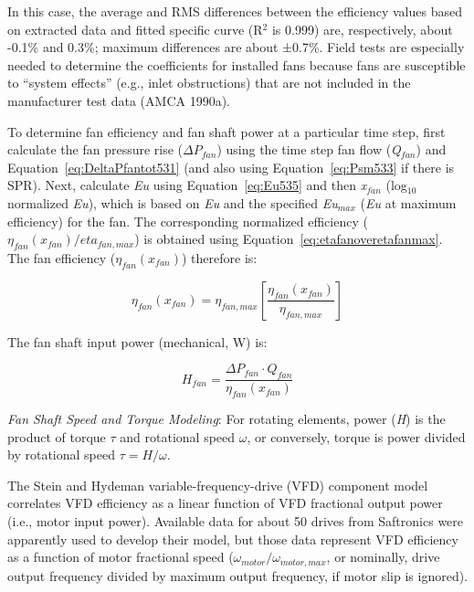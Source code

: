 In this case, the average and RMS differences between the efficiency values based on extracted data and fitted specific curve (R\(^{2}\) is 0.999) are, respectively, about -0.1\% and 0.3\%; maximum differences are about ±0.7\%. Field tests are especially needed to determine the coefficients for installed fans because fans are susceptible to ``system effects'' (e.g., inlet obstructions) that are not included in the manufacturer test data (AMCA 1990a).

To determine fan efficiency and fan shaft power at a particular time step, first calculate the fan pressure rise (\(\Delta P_{fan}\)) using the time step fan flow (\emph{Q\(_{fan}\)}) and Equation~\ref{eq:DeltaPfantot531} (and also using Equation~\ref{eq:Psm533} if there is SPR). Next, calculate \emph{Eu} using Equation~\ref{eq:Eu535} and then \emph{x\(_{fan}\)} (log\(_{10}\) normalized \emph{Eu}), which is based on \emph{Eu} and the specified \emph{Eu\(_{max}\)} (\emph{Eu} at maximum efficiency) for the fan. The corresponding normalized efficiency (\(\eta_{fan}(x_{fan})/eta_{fan,max}\)) is obtained using Equation~\ref{eq:etafanoveretafanmax}. The fan efficiency (\(\eta_{fan}(x_{fan})\)) therefore is:

\begin{equation}
{\eta_{fan}}\left( {{x_{fan}}} \right) = {\eta_{fan,max }}\left[ {\frac{{{\eta_{fan}}\left( {{x_{fan}}} \right)}}{{{\eta_{fan,max }}}}} \right]
\end{equation}

The fan shaft input power (mechanical, W) is:

\begin{equation}
{H_{fan}} = \frac{{\Delta {P_{fan}} \cdot {Q_{fan}}}}{{{\eta_{fan}}\left( {{x_{fan}}} \right)}}
\end{equation}

\emph{Fan Shaft Speed and Torque Modeling}: For rotating elements, power (\emph{H}) is the product of torque \(\tau\) and rotational speed \(\omega\), or conversely, torque is power divided by rotational speed \(\tau = H / \omega\).

The Stein and Hydeman variable-frequency-drive (VFD) component model correlates VFD efficiency as a linear function of VFD fractional output power (i.e., motor input power). Available data for about 50 drives from Saftronics were apparently used to develop their model, but those data represent VFD efficiency as a function of motor fractional speed (\(\omega_{motor} / \omega_{motor,max}\), or nominally, drive output frequency divided by maximum output frequency, if motor slip is ignored).

